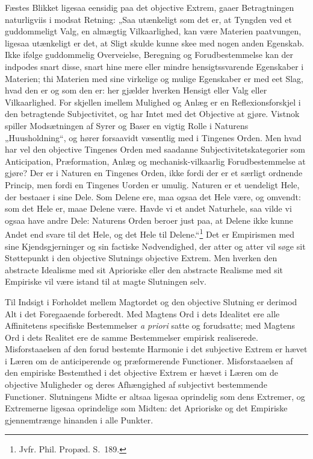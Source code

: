\documentclass[12pt]{book}
\newcommand{\opage}[1]{\marginnote{\footnotesize\textit{[#1]}}}
\begin{document}
Fæstes Blikket ligesaa eensidig paa det objective Extrem, gaaer Betragtningen naturligviis i modsat Retning: „Saa utænkeligt som det er, at Tyngden ved et guddommeligt Valg, en almægtig Vilkaarlighed, kan være Materien paatvungen, ligesaa utænkeligt er det, at Sligt skulde kunne skee med nogen anden Egenskab. Ikke ifølge guddommelig Overveielse, Beregning og Forudbestemmelse kan der indpodes snart disse, snart hine mere eller mindre hensigtssvarende Egenskaber i Materien; thi Materien med sine virkelige og mulige Egenskaber er med eet Slag, hvad den er og som den er: her gjælder hverken Hensigt eller Valg eller Vilkaarlighed. For%
\opage{419}skjellen imellem Mulighed og Anlæg er en Reflexionsforskjel i den betragtende Subjectivitet, og har Intet med det Objective at gjøre. Vistnok spiller Modsætningen af Syrer og Baser en vigtig Rolle i Naturens „Huusholdning“, og hører forsaavidt væsentlig med i Tingenes Orden. Men hvad har vel den objective Tingenes Orden med saadanne Subjectivitetskategorier som Anticipation, Præformation, Anlæg og mechanisk-vilkaarlig Forudbestemmelse at gjøre? Der er i Naturen en Tingenes Orden, ikke fordi der er et særligt ordnende Princip, men fordi en Tingenes Uorden er umulig. Naturen er et uendeligt Hele, der bestaaer i sine Dele. Som Delene ere, maa ogsaa det Hele være, og omvendt: som det Hele er, maae Delene være. Havde vi et andet Naturhele, saa vilde vi ogsaa have andre Dele: Naturens Orden beroer just paa, at Delene ikke kunne Andet end svare til det Hele, og det Hele til Delene.“\footnote{Jvfr. Phil. Propæd. S.~189.}%
{} Det er Empirismen med sine Kjendsgjerninger og sin factiske Nødvendighed, der atter og atter vil søge sit Støttepunkt i den objective Slutnings objective Extrem. Men hverken den abstracte Idealisme med sit Aprioriske eller den abstracte Realisme med sit Empiriske vil være istand til at magte Slutningen selv.

Til Indsigt i Forholdet mellem Magtordet og den objective Slutning er derimod Alt i det Foregaaende forberedt. Med Magtens Ord i dets Idealitet ere alle Affinitetens specifiske Bestemmelser \textit{a priori} satte og forudsatte; med Magtens Ord i dets Realitet ere de samme Bestemmelser empirisk realiserede. Misforstaaelsen af den forud bestemte Harmonie i det subjective Extrem er hævet i Læren om de anticiperende og præformerende Functioner. Misforstaaelsen af den empiriske Bestemthed i det objective Extrem er hævet i Læren om de objective Muligheder og deres Afhængighed af subjectivt bestemmende Functioner. Slutningens Midte er
\opage{420}altsaa ligesaa oprindelig som dens Extremer, og Extremerne ligesaa oprindelige som Midten: det Aprioriske og det Empiriske gjennemtrænge hinanden i alle Punkter.
\end{document}
